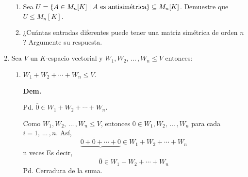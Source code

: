 \documentclass[fleqn]{article}
\begin{document}
\begin{enumerate}
\begin{enumerate}
            \item Sea $ U = \left \{A \in M_n [K] \; \middle \arrowvert \; A \text{ es antisimétrica} \right \} \subseteq M_n [K] $. Demuestre que $ U \leq M_n[K] $.
            
            \item ¿Cuántas entradas diferentes puede tener una matriz simétrica de orden $ n $? Argumente su respuesta.
        \end{enumerate}

        \item Sea $ V $ un $ K $-espacio vectorial y $ W_1, W_2, \, \ldots \, , W_n \leq V $ entonces:
        \begin{enumerate}
            \item $	W_1 + W_2 + \cdots + W_n \leq V $. \par
            \normalfont
            \hspace{2.7mm} \textbf{Dem.} \par

            Pd. $ \overline{0} \in W_1 + W_2 + \cdots + W_n $. \par

            Como $ W_1, W_2,  \, \ldots \, , W_n \leq V $, entonces $ \overline{0} \in W_1, W_2, \, \ldots \, , W_n $ para cada $ i=1, \, \ldots \, ,n $. Así,
            \begin{equation*}
                \underbrace{\overline{0} + \overline{0} + \cdots + \overline{0}} \in W_1 + W_2 + \cdots + W_n
            \end{equation*}
            \vspace{0.5mm} n veces
            Es decir,
            \begin{equation*}
                \overline{0} \in W_1 + W_2 + \cdots + W_n
            \end{equation*}
            Pd. Cerradura de la suma. \par


\end{enumerate}
\end{enumerate}
\end{document}
